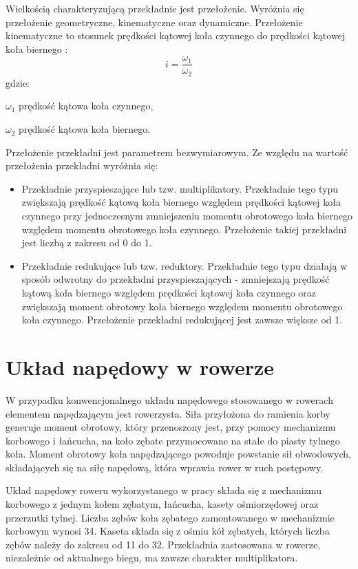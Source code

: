 Wielkością charakteryzującą przekładnie jest przełożenie. Wyróżnia się przełożenie geometryczne, kinematyczne oraz dynamiczne. Przełożenie kinematyczne to stosunek prędkości kątowej koła czynnego do prędkości kątowej koła biernego \cite{przekladnie}:
\begin{equation}
    i = \frac{\omega_1}{\omega_2}
    \label{eq:przelozenieKinematyczne}
\end{equation}
gdzie:
\begin{eqwhere}[2cm]
	\item[$\omega_1$] prędkość kątowa koła czynnego,
	\item[$\omega_2$] prędkość kątowa koła biernego.
\end{eqwhere}

Przełożenie przekładni jest parametrem bezwymiarowym. Ze względu na wartość przełożenia przekładni wyróżnia się:
\begin{itemize}
\item
Przekładnie przyspieszające lub tzw. multiplikatory. Przekładnie tego typu zwiększają prędkość kątową koła biernego względem prędkości kątowej koła czynnego przy jednoczesnym zmniejszeniu momentu obrotowego koła biernego względem momentu obrotowego koła czynnego. Przełożenie takiej przekładni jest liczbą z zakresu od 0 do 1.
\item
Przekładnie redukujące lub tzw. reduktory. Przekładnie tego typu działają w sposób odwrotny do przekładni przyspieszających - zmniejszają prędkość kątową koła biernego względem prędkości kątowej koła czynnego oraz zwiększają moment obrotowy koła biernego względem momentu obrotowego koła czynnego. Przełożenie przekładni redukującej jest zawsze większe od 1.
\end{itemize} 
\section{Układ napędowy w rowerze}
W przypadku konwencjonalnego układu napędowego stosowanego w rowerach elementem napędzającym jest rowerzysta. Siła przyłożona do ramienia korby generuje moment obrotowy, który przenoszony jest, przy pomocy mechanizmu korbowego i łańcucha, na koło zębate przymocowane na stałe do piasty tylnego koła. Moment obrotowy koła napędzającego powoduje powstanie sił obwodowych, składających się na siłę napędową, która wprawia rower w ruch postępowy.

Układ napędowy roweru wykorzystanego w pracy składa się z mechanizmu korbowego z jednym kołem zębatym, łańcucha, kasety ośmiorzędowej oraz przerzutki tylnej. Liczba zębów koła zębatego zamontowanego w mechanizmie korbowym wynosi 34. Kaseta składa się z ośmiu kół zębatych, których liczba zębów należy do zakresu od 11 do 32. Przekładnia zastosowana w rowerze, niezależnie od aktualnego biegu, ma zawsze charakter multiplikatora.

